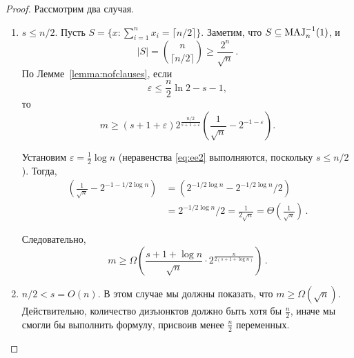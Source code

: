 \begin{proof}
	Рассмотрим два случая.
	\begin{enumerate}
		\item $s \le n/2$.
		Пусть $S = \{x : \sum_{i = 1}^{n} x_i = \lceil n/2\rceil\}$. 
		Заметим, что $S \subseteq \operatorname{MAJ}_n^{-1}(1)$, и 
		\[|S| = { \binom{n}{\lceil n/2 \rceil}} \ge \frac{2^n}{\sqrt{n}}\, .\]
		По Лемме~\ref{lemma:nofclauses}, если 
		\begin{equation}\label{eq:ee2}
			\varepsilon \le \frac{n}{2} \ln 2 -s - 1,
		\end{equation}
		то
		\[ m \ge (s+1+\varepsilon) 2^{\frac{n/2}{s+1+\varepsilon}} \left(\frac{1}{\sqrt{n}} - 2^{-1-\varepsilon}\right).\]
		
		Установим $\varepsilon = \frac{1}{2}\log n$ (неравенства \ref{eq:ee2} выполняются, поскольку $s \le n/2$). Тогда,
		\begin{align}
			\left(\frac{1}{\sqrt{n}} - 2^{-1 - 1/2 \log n}\right) &= 
			\left(2^{- 1/2 \log n} - 2^{-1/2 \log n}/2 \right)\\ &= 
			2^{- 1/2 \log n} / 2 = \frac{1}{2\sqrt{n}} = 
			\Theta\left(\frac{1}{\sqrt{n}}\right)\,.
		\end{align}
		
		Следовательно,
		\[m \ge \Omega \left(\frac{s+1 + \log n}{\sqrt{n}} \cdot 2^{\frac{n}{2(s+1 + \log n)}} \right)\, .\]
		\item $n/2 < s = O(n)$.
		В этом случае мы должны показать, что $m \ge \Omega(\sqrt{n})$.
		Действительно, количество дизъюнктов должно быть хотя бы $\frac{n}{2}$, 
		иначе мы смогли бы выполнить формулу, присвоив менее $\frac{n}{2}$ переменных.
	\end{enumerate}
\end{proof}

